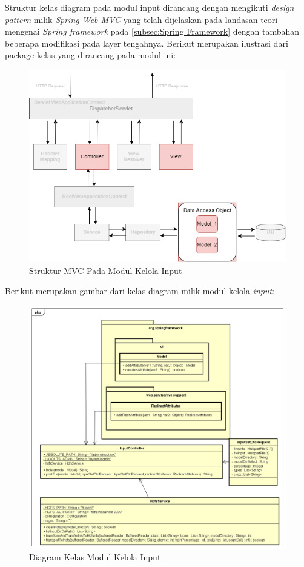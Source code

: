Struktur kelas diagram pada modul input dirancang dengan mengikuti \textit{design pattern} milik \textit{Spring Web MVC} yang telah dijelaskan pada landasan teori mengenai \textit{Spring framework} pada \ref{subsec:Spring Framework} dengan tambahan beberapa modifikasi pada layer tengahnya. Berikut merupakan ilustrasi dari package kelas yang dirancang pada modul ini:
\begin{figure}[H]
	\centering
	\includegraphics[scale=0.7]{ClassDiagramLengkap/springmvc_rev1}
	\caption[Struktur MVC Pada Modul Kelola Input]{Struktur MVC Pada Modul Kelola Input}
	\label{fig:Struktur MVC Pada Modul Kelola Input}
\end{figure}

Berikut merupakan gambar dari kelas diagram milik modul kelola \textit{input}:
\begin{figure}[H]
	\centering
	\includegraphics[scale=0.45]{ClassDiagramLengkap/CD_Input}
	\caption[Diagram Kelas Modul Kelola Input]{Diagram Kelas Modul Kelola Input}
	\label{fig:Diagram Kelas Modul Kelola Input}
\end{figure}

